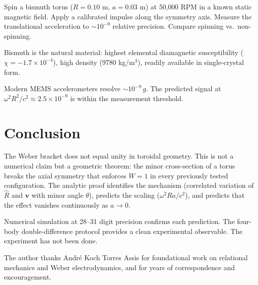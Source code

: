 \documentclass[12pt,preprint,amsmath,amssymb]{revtex4-2}
\begin{document}
Spin a bismuth torus ($R = 0.10$ m, $a = 0.03$ m) at 50{,}000 RPM in a known static
magnetic field. Apply a calibrated impulse along the symmetry axis. Measure the
translational acceleration to $\sim\!10^{-9}$ relative precision. Compare spinning
vs.\ non-spinning.

Bismuth is the natural material: highest elemental diamagnetic susceptibility
($\chi = -1.7 \times 10^{-4}$), high density (9780 kg/m$^3$), readily available
in single-crystal form.

Modern MEMS accelerometers resolve $\sim\!10^{-9}\,g$.
The predicted signal at $\omega^2 R^2/c^2 \approx 2.5 \times 10^{-9}$ is within
the measurement threshold.

\section{Conclusion}

The Weber bracket does not equal unity in toroidal geometry. This is not a numerical
claim but a geometric theorem: the minor cross-section of a torus breaks the axial
symmetry that enforces $W = 1$ in every previously tested configuration. The analytic
proof identifies the mechanism (correlated variation of $\hat{R}$ and $\mathbf{v}$
with minor angle $\theta$), predicts the scaling ($\omega^2 R a / c^2$), and
predicts that the effect vanishes continuously as $a \to 0$.

Numerical simulation at 28--31 digit precision confirms each prediction.
The four-body double-difference protocol provides a clean experimental observable.
The experiment has not been done.

\begin{acknowledgments}
The author thanks Andr\'e Koch Torres Assis for foundational work on relational
mechanics and Weber electrodynamics, and for years of correspondence and encouragement.
\end{acknowledgments}
\end{document}
